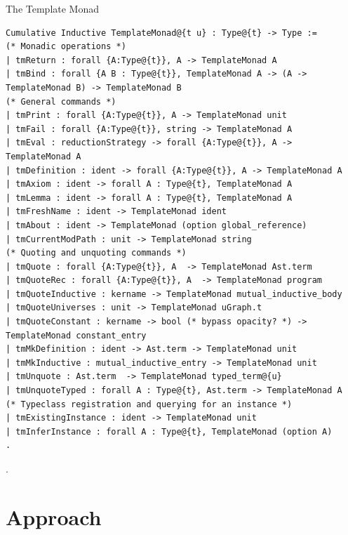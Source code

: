 \documentclass[aspectratio=169]{beamer}
\begin{document}
\begin{frame}[fragile]{The Template Monad}
\begin{lstlisting}[language=Coq, mathescape=true, frame=none, basicstyle=\tiny]
Cumulative Inductive TemplateMonad@{t u} : Type@{t} -> Type :=
(* Monadic operations *)
| tmReturn : forall {A:Type@{t}}, A -> TemplateMonad A
| tmBind : forall {A B : Type@{t}}, TemplateMonad A -> (A -> TemplateMonad B) -> TemplateMonad B
(* General commands *)
| tmPrint : forall {A:Type@{t}}, A -> TemplateMonad unit
| tmFail : forall {A:Type@{t}}, string -> TemplateMonad A
| tmEval : reductionStrategy -> forall {A:Type@{t}}, A -> TemplateMonad A
| tmDefinition : ident -> forall {A:Type@{t}}, A -> TemplateMonad A
| tmAxiom : ident -> forall A : Type@{t}, TemplateMonad A
| tmLemma : ident -> forall A : Type@{t}, TemplateMonad A
| tmFreshName : ident -> TemplateMonad ident
| tmAbout : ident -> TemplateMonad (option global_reference)
| tmCurrentModPath : unit -> TemplateMonad string
(* Quoting and unquoting commands *)
| tmQuote : forall {A:Type@{t}}, A  -> TemplateMonad Ast.term
| tmQuoteRec : forall {A:Type@{t}}, A  -> TemplateMonad program
| tmQuoteInductive : kername -> TemplateMonad mutual_inductive_body
| tmQuoteUniverses : unit -> TemplateMonad uGraph.t
| tmQuoteConstant : kername -> bool (* bypass opacity? *) -> TemplateMonad constant_entry
| tmMkDefinition : ident -> Ast.term -> TemplateMonad unit
| tmMkInductive : mutual_inductive_entry -> TemplateMonad unit
| tmUnquote : Ast.term  -> TemplateMonad typed_term@{u}
| tmUnquoteTyped : forall A : Type@{t}, Ast.term -> TemplateMonad A
(* Typeclass registration and querying for an instance *)
| tmExistingInstance : ident -> TemplateMonad unit
| tmInferInstance : forall A : Type@{t}, TemplateMonad (option A)
.
\end{lstlisting}


.

\end{frame}

\section{Approach}
\end{document}
